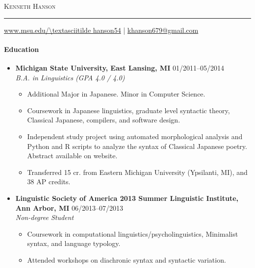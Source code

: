 \documentclass[10pt,oneside]{article}
\makeatletter
\newcommand{\name}{Kenneth Hanson}
\newcommand{\email}{khanson679@gmail.com}
\newcommand{\website}{www.msu.edu/\textasciitilde hanson54}
\newcommand{\bigname}[1]{
	\begin{center}\textsc{\Huge#1}\end{center}
}
\newenvironment{ressection}[1]{
	\paragraph{\Large#1}
	\begin{itemize}
}{
	\end{itemize}
}
\newcommand{\resbigitem}[4]{
	\item
	\textbf{#1} \hfill #2 \\
	\textit{#3} \hfill \textit{#4}
}
\newenvironment{ressubsec}[4]{
	\resbigitem{#1}{#2}{#3}{#4}
	\begin{itemize}
}{
	\end{itemize}
}
\makeatother
\begin{document}

\bigname{\name}
\vspace{-8pt} \rule{\textwidth}{1pt}

\vspace{-1pt} {\small \hfill \url{\website} | \href{mailto:\email}{\email}}

\vspace{8 pt}


\begin{ressection}{Education}

	\begin{ressubsec}{Michigan State University, East Lansing, MI}
            {01/2011--05/2014}
		    {B.A. in Linguistics (GPA 4.0 / 4.0)}
            {}
		\item{Additional Major in Japanese. Minor in Computer Science.}
		\item{Coursework in Japanese linguistics, graduate level syntactic theory, Classical Japanese, compilers, and software design.}
		\item{Independent study project using automated morphological analysis and Python and R scripts to analyze the syntax of Classical Japanese poetry. Abstract available on website.}
		\item{Transferred 15 cr. from Eastern Michigan University (Ypsilanti, MI), and 38 AP credits.}
	\end{ressubsec}
    
    \begin{ressubsec}{Linguistic Society of America 2013 Summer Linguistic Institute, Ann Arbor, MI}
            {06/2013--07/2013}
            {Non-degree Student}
            {}
            \item{Coursework in computational linguistics/psycholinguistics, Minimalist syntax, and language typology.}
            \item{Attended workshops on diachronic syntax and syntactic variation.}
	\end{ressubsec}
\end{ressection}
\end{document}
